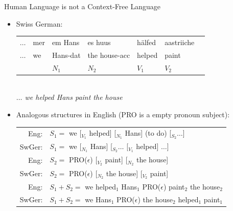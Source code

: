\documentclass[landscape]{slides}
\begin{document}
\begin{slide}{Human Language is not a Context-Free Language}
\begin{itemize}
\item Swiss German:
\begin{center}
\begin{tabular}{lllllll}
$\ldots$ & mer & em Hans & es  huus & h\"alfed & aastriiche \\
$\ldots$ & we & Hans-{\sc dat} & the  house-{\sc acc} & helped & paint \\
& & $N_1$ & $N_2$ & $V_1$ & $V_2$ 
\end{tabular}\\
{\em $\ldots$ we helped Hans paint the house}
\end{center}
\item Analogous structures in English (PRO is a empty pronoun subject):
\begin{tabular}{rl}
\hline
Eng:      &$S_1=$ we {\color{blue}[$_{V_1}$ helped]} {\color{red}[$_{N_1}$ Hans]} {\color{bgblue}(to do)} [$_{S_2} \ldots$] \\
SwGer: &$S_1=$ we {\color{red}[$_{N_1}$ Hans]}   [$_{S_2} \ldots$ {\color{blue}[$_{V_1}$ helped]} $\ldots$] \\
\hline
Eng:      &$S_2=$ PRO($\epsilon$) {\color{blue}[$_{V_2}$ paint]} {\color{red}[$_{N_2}$ the house]} \\
SwGer: &$S_2=$ PRO($\epsilon$) {\color{red}[$_{N_2}$ the house]}  {\color{blue}[$_{V_2}$ paint]} \\
\hline
Eng:      &$S_1+S_2=$ we helped$_1$ Hans$_1$ PRO($\epsilon$) paint$_2$ the house$_2$ \\
SwGer: &$S_1+S_2=$ we Hans$_1$ PRO($\epsilon$) the house$_2$ helped$_1$ paint$_1$ \\
\hline
\end{tabular}
\end{itemize}
\end{slide}
\end{document}
